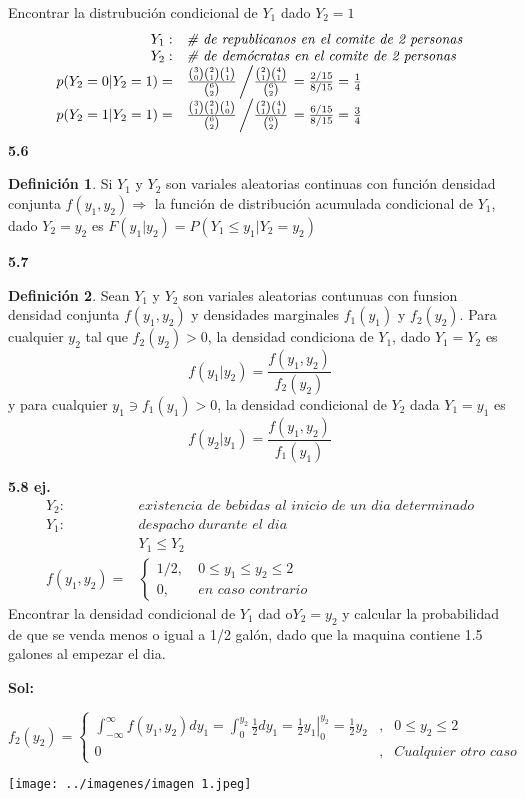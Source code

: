 \documentclass[12pt,letterpaper]{article}
\theoremstyle{definition}
\newtheorem{definition}{Definición}[section]
\begin{document}
Encontrar la distrubución condicional de $Y_1$ dado $Y_2=1$
\[
\begin{array}{rl}
	Y_1:& \textit{\# de republicanos en el comite de 2 personas}\\
	Y_2:& \textit{\# de demócratas en el comite de 2 personas}\\
	p(Y_2=0|Y_2=1)=&\frac{{3 \choose 0}{2 \choose 1}{1 \choose 1}}{{6 \choose 2}}\left/\frac{{2 \choose 1}{4 \choose 1}}{{6 \choose 2}}\right.=\frac{2/15}{8/15}=\frac{1}{4}\\
	p(Y_2=1|Y_2=1)=&\frac{{3 \choose 1}{2 \choose 1}{1 \choose 0}}{{6 \choose 2}}\left/\frac{{2 \choose 1}{4 \choose 1}}{{6 \choose 2}}\right.=\frac{6/15}{8/15}=\frac{3}{4}
\end{array}
\]
\textbf{5.6}
\begin{definition}
	Si $Y_1$ y $Y_2$ son variales aleatorias continuas con función densidad conjunta $f(y_1,y_2)\Rightarrow $ la función de distribución acumulada condicional de $Y_1$, dado $Y_2=y_2$ es $F(y_1|y_2)=P(Y_1\leq y_1|Y_2=y_2)$
\end{definition}
\textbf{5.7}
\begin{definition}
	Sean $Y_1$ y $Y_2$ son variales aleatorias contunuas con funsion densidad conjunta $f(y_1,y_2)$ y densidades marginales $f_1(y_1)$ y $f_2(y_2)$. Para cualquier $y_2$ tal que $f_2(y_2)>0$, la densidad condiciona de $Y_1$, dado $Y_1=Y_2$ es 
	\[f(y_1|y_2)=\frac{f(y_1,y_2)}{f_2(y_2)}\]
y para cualquier $y_1\ni f_1(y_1)>0$, la densidad condicional de $Y_2$ dada $Y_1=y_1$ es 
\[f(y_2|y_1)=\frac{f(y_1,y_2)}{f_1(y_1)}\]
\end{definition}
\textbf{5.8 ej.}
\[
\begin{array}{rl}
	Y_2:& \textit{existencia de bebidas al inicio de un dia determinado}\\
	Y_1:& \textit{despacho durante el dia}\\
	& Y_1\leq Y_2\\
	f(y_1,y_2)=& \left\{
	\begin{array}{rl}
		1/2,&\ 0\leq y_1\leq y_2 \leq 2\\
		0,&\ \textit{en caso contrario}
	\end{array}
	\right.
\end{array}
\]
Encontrar la densidad condicional de $Y_1$ dad o$Y_2=y_2$ y calcular la probabilidad de que se venda menos o igual a 1/2 galón, dado que la maquina contiene 1.5 galones al empezar el dia.

\textbf{Sol: }

\[f_2(y_2)=\left\{
\begin{array}{ccr}
	\int^{\infty}_{-\infty} f(y_1,y_2)dy_1=\int^{y_2}_0\frac{1}{2}dy_1=\left.\frac{1}{2}y_1\right|^{y_2}_0=\frac{1}{2}y_2&,& 0\leq y_2\leq 2\\
	0&,& \textit{Cualquier otro caso}
\end{array}
\right.
\]
\begin{center}
\texttt{[image: ../imagenes/imagen 1.jpeg]} 
\end{center}
\end{document}
